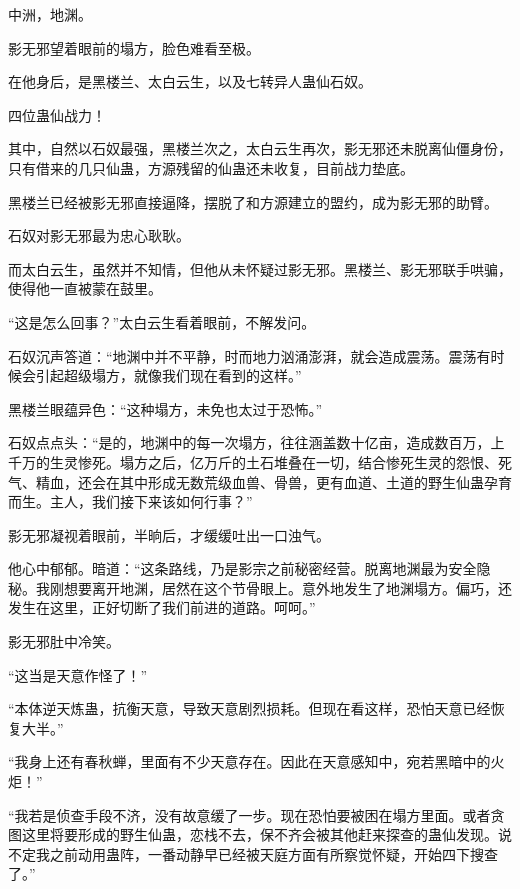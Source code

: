 
\begin{this_body}



中洲，地渊。

影无邪望着眼前的塌方，脸色难看至极。

在他身后，是黑楼兰、太白云生，以及七转异人蛊仙石奴。

四位蛊仙战力！

其中，自然以石奴最强，黑楼兰次之，太白云生再次，影无邪还未脱离仙僵身份，只有借来的几只仙蛊，方源残留的仙蛊还未收复，目前战力垫底。

黑楼兰已经被影无邪直接逼降，摆脱了和方源建立的盟约，成为影无邪的助臂。

石奴对影无邪最为忠心耿耿。

而太白云生，虽然并不知情，但他从未怀疑过影无邪。黑楼兰、影无邪联手哄骗，使得他一直被蒙在鼓里。

“这是怎么回事？”太白云生看着眼前，不解发问。

石奴沉声答道：“地渊中并不平静，时而地力汹涌澎湃，就会造成震荡。震荡有时候会引起超级塌方，就像我们现在看到的这样。”

黑楼兰眼蕴异色：“这种塌方，未免也太过于恐怖。”

石奴点点头：“是的，地渊中的每一次塌方，往往涵盖数十亿亩，造成数百万，上千万的生灵惨死。塌方之后，亿万斤的土石堆叠在一切，结合惨死生灵的怨恨、死气、精血，还会在其中形成无数荒级血兽、骨兽，更有血道、土道的野生仙蛊孕育而生。主人，我们接下来该如何行事？”

影无邪凝视着眼前，半晌后，才缓缓吐出一口浊气。

他心中郁郁。暗道：“这条路线，乃是影宗之前秘密经营。脱离地渊最为安全隐秘。我刚想要离开地渊，居然在这个节骨眼上。意外地发生了地渊塌方。偏巧，还发生在这里，正好切断了我们前进的道路。呵呵。”

影无邪肚中冷笑。

“这当是天意作怪了！”

“本体逆天炼蛊，抗衡天意，导致天意剧烈损耗。但现在看这样，恐怕天意已经恢复大半。”

“我身上还有春秋蝉，里面有不少天意存在。因此在天意感知中，宛若黑暗中的火炬！”

“我若是侦查手段不济，没有故意缓了一步。现在恐怕要被困在塌方里面。或者贪图这里将要形成的野生仙蛊，恋栈不去，保不齐会被其他赶来探查的蛊仙发现。说不定我之前动用蛊阵，一番动静早已经被天庭方面有所察觉怀疑，开始四下搜查了。”


\end{this_body}
